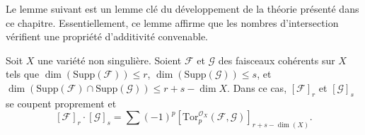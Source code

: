 \noindent
Le lemme suivant est un lemme clé du développement de la théorie
présenté dans ce chapitre. Essentiellement, ce lemme affirme que
les nombres d'intersection vérifient une propriété d'additivité convenable.

\begin{lemma}
\label{lemma-tor-sheaf}
\begin{reference}
\cite[Chapter V]{Serre_algebre_locale}
\end{reference}
Soit $X$ une variété non singulière. Soient $\mathcal{F}$ et
$\mathcal{G}$ des faisceaux cohérents sur $X$ tels que
$\dim(\text{Supp}(\mathcal{F})) \leq r$,
$\dim(\text{Supp}(\mathcal{G})) \leq s$, et
$\dim(\text{Supp}(\mathcal{F}) \cap \text{Supp}(\mathcal{G}) )
\leq r + s - \dim X$. Dans ce cas, $[\mathcal{F}]_r$ et $[\mathcal{G}]_s$
se coupent proprement et
$$
[\mathcal{F}]_r \cdot [\mathcal{G}]_s =
\sum (-1)^p
[\text{Tor}_p^{\mathcal{O}_X}(\mathcal{F}, \mathcal{G})]_{r + s - \dim(X)}.
$$
\end{lemma}

